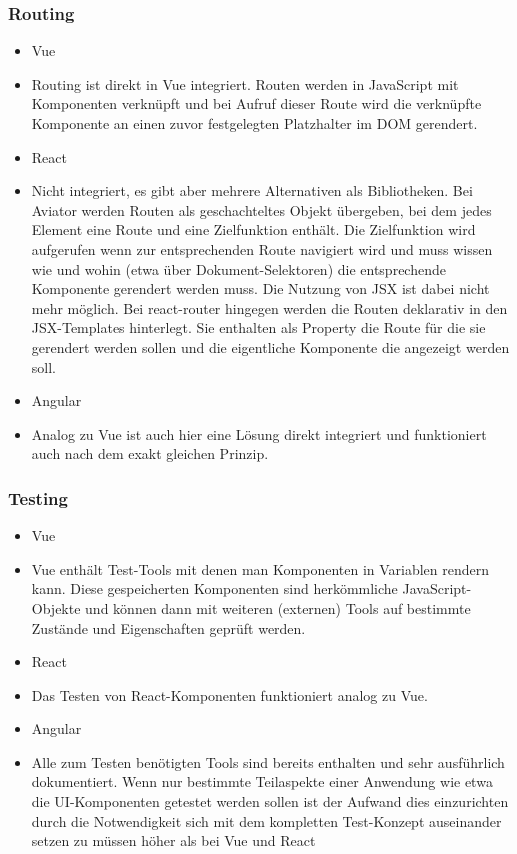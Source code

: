 \subsubsection{Routing}
\begin{itemize}
    \item{Vue}
    \item[] Routing ist direkt in Vue integriert. Routen werden in JavaScript mit Komponenten verknüpft und bei Aufruf dieser Route wird die verknüpfte Komponente an einen zuvor festgelegten Platzhalter im DOM gerendert.
    \item{React}
    \item[] Nicht integriert, es gibt aber mehrere Alternativen als Bibliotheken. Bei Aviator werden Routen als geschachteltes Objekt übergeben, bei dem jedes Element eine Route und eine Zielfunktion enthält. Die Zielfunktion wird aufgerufen wenn zur entsprechenden Route navigiert wird und muss wissen wie und wohin (etwa über Dokument-Selektoren) die entsprechende Komponente gerendert werden muss. Die Nutzung von JSX ist dabei nicht mehr möglich. Bei react-router hingegen werden die Routen deklarativ in den JSX-Templates hinterlegt. Sie enthalten als Property die Route für die sie gerendert werden sollen und die eigentliche Komponente die angezeigt werden soll.
    \item{Angular}
    \item[] Analog zu Vue ist auch hier eine Lösung direkt integriert und funktioniert auch nach dem exakt gleichen Prinzip.
\end{itemize}

\subsubsection{Testing}
\begin{itemize}
    \item{Vue}
    \item[] Vue enthält Test-Tools mit denen man Komponenten in Variablen rendern kann. Diese gespeicherten Komponenten sind herkömmliche JavaScript-Objekte und können dann mit weiteren (externen) Tools auf bestimmte Zustände und Eigenschaften geprüft werden.
    \item{React}
    \item[] Das Testen von React-Komponenten funktioniert analog zu Vue.
    \item{Angular}
    \item[] Alle zum Testen benötigten Tools sind bereits enthalten und sehr ausführlich dokumentiert. Wenn nur bestimmte Teilaspekte einer Anwendung wie etwa die UI-Komponenten getestet werden sollen ist der Aufwand dies einzurichten durch die Notwendigkeit sich mit dem kompletten Test-Konzept auseinander setzen zu müssen höher als bei Vue und React
\end{itemize}

